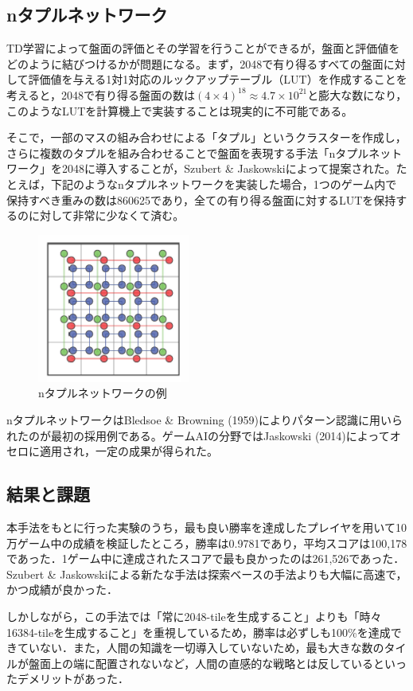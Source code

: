 \documentclass{suribt}
\begin{document}
\subsection{nタプルネットワーク}
TD学習によって盤面の評価とその学習を行うことができるが，盤面と評価値をどのように結びつけるかが問題になる。まず，2048で有り得るすべての盤面に対して評価値を与える1対1対応のルックアップテーブル（LUT）を作成することを考えると，2048で有り得る盤面の数は$(4 \times 4)^{18} \approx 4.7 \times 10^{21}$と膨大な数になり，このようなLUTを計算機上で実装することは現実的に不可能である。

そこで，一部のマスの組み合わせによる「タプル」というクラスターを作成し，さらに複数のタプルを組み合わせることで盤面を表現する手法「nタプルネットワーク」を2048に導入することが，Szubert \& Jaskowskiによって提案された。たとえば，下記のようなnタプルネットワークを実装した場合，1つのゲーム内で保持すべき重みの数は860625であり，全ての有り得る盤面に対するLUTを保持するのに対して非常に少なくて済む。

\begin{figure}[H]
	\centering
	\includegraphics[width=5cm]{figure_001.png}
	\caption{nタプルネットワークの例}
\end{figure}

nタプルネットワークはBledsoe \& Browning (1959)によりパターン認識に用いられたのが最初の採用例である。ゲームAIの分野ではJaskowski (2014)によってオセロに適用され，一定の成果が得られた。

\subsection{結果と課題}
本手法をもとに行った実験のうち，最も良い勝率を達成したプレイヤを用いて10万ゲーム中の成績を検証したところ，勝率は0.9781であり，平均スコアは100,178であった．1ゲーム中に達成されたスコアで最も良かったのは261,526であった．Szubert \& Jaskowskiによる新たな手法は探索ベースの手法よりも大幅に高速で，かつ成績が良かった．

しかしながら，この手法では「常に2048-tileを生成すること」よりも「時々16384-tileを生成すること」を重視しているため，勝率は必ずしも100\%を達成できていない．また，人間の知識を一切導入していないため，最も大きな数のタイルが盤面上の端に配置されないなど，人間の直感的な戦略とは反しているといったデメリットがあった．
\end{document}

